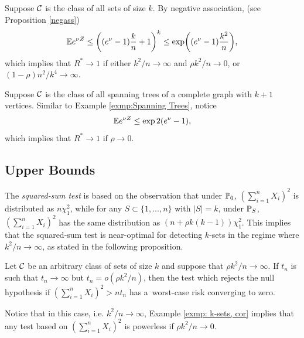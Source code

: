 \documentclass[10pt, oneside]{article}
\begin{document}
\begin{exmp}
  \label{exmp: k-sets, cor}
  Suppose ${\mathcal C}$ is the class of all sets of size $k$. By negative association, (see Proposition \ref{negass})
  \[
  \mathbb{E} e^{\nu Z} \le\biggl((e^\nu-1) \frac{k}{n}+1\biggr)^k
  \le\exp\biggl((e^\nu-1) \frac{k^2}{n}\biggr),
  \]
  which implies that $R^* \to1$ if either $k^2/n \to\infty$ and $\rho k^2/n \to0$, or $(1-\rho)n^2/k^4 \to\infty$.
\end{exmp}


\begin{exmp}
  Suppose ${\mathcal C}$ is the class of all spanning trees of a complete graph with $k+1$ vertices. Similar to Example \ref{exmp:Spanning Trees}, notice
  \[
  \mathbb{E} e^{\nu Z} \le \exp{2(e^\nu-1)},
  \]
  which implies that $R^* \to1$ if $\rho\to0$.
\end{exmp}


\subsection{Upper Bounds}

The \textit{squared-sum test} is based on the observation that under $\mathbb{P}_0$, $(\sum_{i=1}^n X_i)^2$ is distributed as $n
\chi_1^2$, while for
any $S\subset\{1,\ldots,n\}$ with $|S|=k$, under
$\mathbb{P}_S$, $(\sum_{i=1}^n X_i)^2$ has the same distribution
as $(n + \rho k(k-1)) \chi_1^2$. This implies that the squared-sum test is near-optimal for detecting
$k$-sets in the regime where $k^2/n \to\infty$, as stated in the following proposition.
%
\begin{prop}
\label{prpsq}
Let ${\mathcal C}$ be an arbitrary class of sets of size $k$ and suppose that $\rho k^2/n \to\infty$.
If $t_n$ is such that $t_n\to\infty$ but $t_n = o(\rho k^2/n)$, then the test which rejects the null hypothesis
if $(\sum_{i=1}^n X_i)^2 > n t_n$ has a~worst-case risk converging to zero.
\end{prop}
Notice that in this case, i.e. $k^2/n \to\infty$, Example \ref{exmp: k-sets, cor} implies that any test based on $(\sum_{i=1}^n X_i)^2$ is powerless if $\rho k^2/n \to0$.
\end{document}
